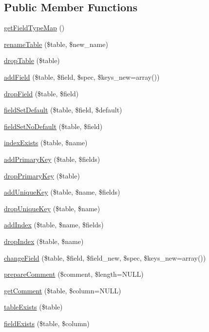 \subsection*{Public Member Functions}
\begin{DoxyCompactItemize}
\item 
\hyperlink{classDatabaseSchema__mysql_abe6bab05d4dca80ecad5fcd0fb17145e}{getFieldTypeMap} ()
\item 
\hyperlink{classDatabaseSchema__mysql_acd72dda186ab4889a8d5ae2f51b92dba}{renameTable} (\$table, \$new\_\-name)
\item 
\hyperlink{classDatabaseSchema__mysql_a9dbfabde4257668bdeb08965735fb823}{dropTable} (\$table)
\item 
\hyperlink{classDatabaseSchema__mysql_ae30b5689e92ccfc88f2dc2b7964d0234}{addField} (\$table, \$field, \$spec, \$keys\_\-new=array())
\item 
\hyperlink{classDatabaseSchema__mysql_a87bb4ca35f69061ca489d45d4f74b3c7}{dropField} (\$table, \$field)
\item 
\hyperlink{classDatabaseSchema__mysql_ae88383059811a3c3328455ef04aea15a}{fieldSetDefault} (\$table, \$field, \$default)
\item 
\hyperlink{classDatabaseSchema__mysql_abf4208a396175d211decc395ea6cc63f}{fieldSetNoDefault} (\$table, \$field)
\item 
\hyperlink{classDatabaseSchema__mysql_aeef6ccd88482787cdbb4ff4e65bed2dd}{indexExists} (\$table, \$name)
\item 
\hyperlink{classDatabaseSchema__mysql_af133b10cf19353fef894d1a0550f7b2b}{addPrimaryKey} (\$table, \$fields)
\item 
\hyperlink{classDatabaseSchema__mysql_adf1b000bebd7b19a83506a01dab36972}{dropPrimaryKey} (\$table)
\item 
\hyperlink{classDatabaseSchema__mysql_a5e5e984d6f48b61962290a4715e3c143}{addUniqueKey} (\$table, \$name, \$fields)
\item 
\hyperlink{classDatabaseSchema__mysql_a7301360fe0f030204827f75495448c41}{dropUniqueKey} (\$table, \$name)
\item 
\hyperlink{classDatabaseSchema__mysql_a18bb0f395ccfb5bab5385485d1b8b12a}{addIndex} (\$table, \$name, \$fields)
\item 
\hyperlink{classDatabaseSchema__mysql_a2bd472fc5238f3b5d53284768475881c}{dropIndex} (\$table, \$name)
\item 
\hyperlink{classDatabaseSchema__mysql_a7da23695df0408c0b8d0bbb95bf32ef6}{changeField} (\$table, \$field, \$field\_\-new, \$spec, \$keys\_\-new=array())
\item 
\hyperlink{classDatabaseSchema__mysql_a3769228a1a4831bc1dd75d9d4c5802dc}{prepareComment} (\$comment, \$length=NULL)
\item 
\hyperlink{classDatabaseSchema__mysql_aff75d99144376d1dabbec862c206a645}{getComment} (\$table, \$column=NULL)
\item 
\hyperlink{classDatabaseSchema__mysql_a3590c4ea18bb4d950f1595370f4ae211}{tableExists} (\$table)
\item 
\hyperlink{classDatabaseSchema__mysql_a3f375da9ca1d0e8c7000820366457256}{fieldExists} (\$table, \$column)
\end{DoxyCompactItemize}
